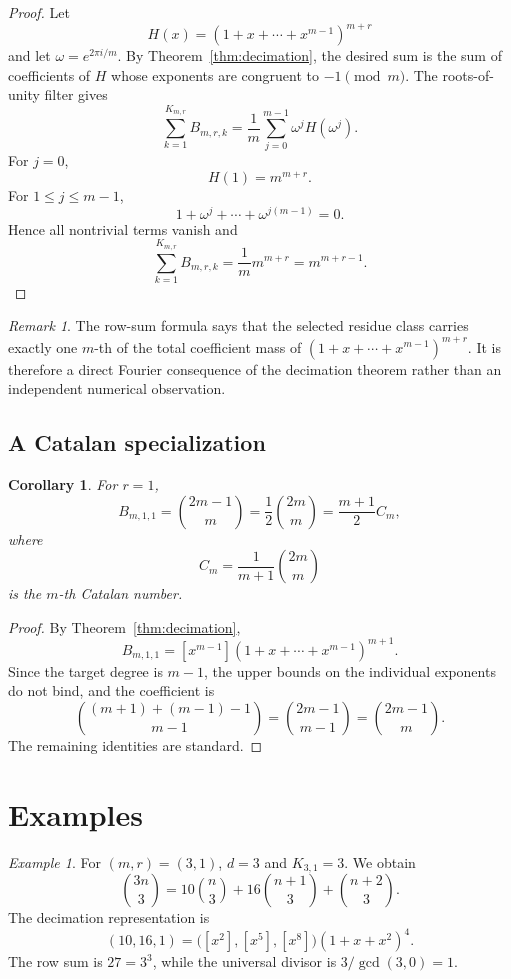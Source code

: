 \documentclass[11pt]{article}
\newtheorem{corollary}[theorem]{Corollary}
\theoremstyle{definition}
\theoremstyle{remark}
\newtheorem{remark}[theorem]{Remark}
\newtheorem{example}[theorem]{Example}
\begin{document}
\begin{proof}
Let
\[
 H(x)=(1+x+\cdots+x^{m-1})^{m+r}
\]
and let $\omega=e^{2\pi i/m}$. By Theorem~\ref{thm:decimation}, the desired
sum is the sum of coefficients of $H$ whose exponents are congruent to
$-1\pmod m$. The roots-of-unity filter gives
\[
 \sum_{k=1}^{K_{m,r}}B_{m,r,k}
 =
 \frac1m\sum_{j=0}^{m-1}\omega^jH(\omega^j).
\]
For $j=0$,
\[
 H(1)=m^{m+r}.
\]
For $1\le j\le m-1$,
\[
 1+\omega^j+\cdots+\omega^{j(m-1)}=0.
\]
Hence all nontrivial terms vanish and
\[
 \sum_{k=1}^{K_{m,r}}B_{m,r,k}
 =\frac1m m^{m+r}
 =m^{m+r-1}.
\]
\end{proof}

\begin{remark}
The row-sum formula says that the selected residue class carries exactly
one $m$-th of the total coefficient mass of
$(1+x+\cdots+x^{m-1})^{m+r}$. It is therefore a direct Fourier consequence
of the decimation theorem rather than an independent numerical
observation.
\end{remark}

\subsection{A Catalan specialization}

\begin{corollary}
\label{cor:catalan}
For $r=1$,
\[
 B_{m,1,1}
 =
 \binom{2m-1}{m}
 =
 \frac12\binom{2m}{m}
 =
 \frac{m+1}{2}C_m,
\]
where
\[
 C_m=\frac1{m+1}\binom{2m}{m}
\]
is the $m$-th Catalan number.
\end{corollary}

\begin{proof}
By Theorem~\ref{thm:decimation},
\[
 B_{m,1,1}
 =[x^{m-1}](1+x+\cdots+x^{m-1})^{m+1}.
\]
Since the target degree is $m-1$, the upper bounds on the individual
exponents do not bind, and the coefficient is
\[
 \binom{(m+1)+(m-1)-1}{m-1}
 =\binom{2m-1}{m-1}
 =\binom{2m-1}{m}.
\]
The remaining identities are standard.
\end{proof}

\section{Examples}

\begin{example}
For $(m,r)=(3,1)$, $d=3$ and $K_{3,1}=3$. We obtain
\[
 \binom{3n}{3}
 =
 10\binom{n}{3}
 +16\binom{n+1}{3}
 +\binom{n+2}{3}.
\]
The decimation representation is
\[
 (10,16,1)
 =
 \bigl([x^2],[x^5],[x^8]\bigr)(1+x+x^2)^4.
\]
The row sum is $27=3^3$, while the universal divisor is
$3/\gcd(3,0)=1$.
\end{example}
\end{document}
